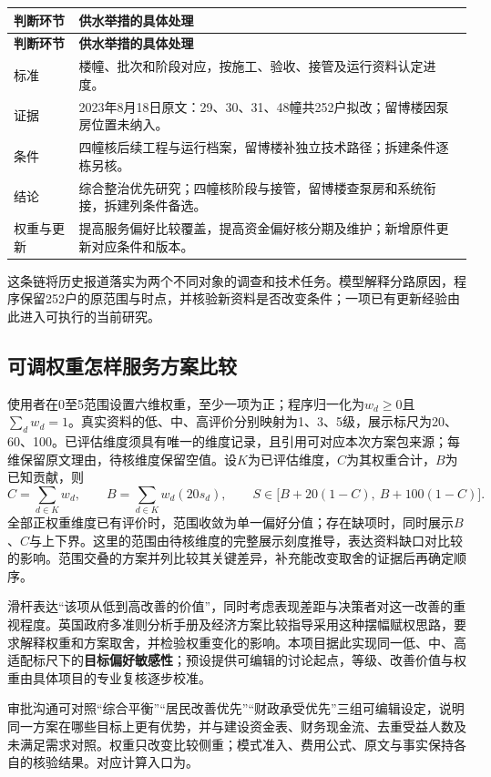 \documentclass[UTF8,11pt,fontset=windows]{ctexart}
\begin{document}
\begin{longtable}{@{}L{27mm}L{132mm}@{}}
\toprule\textbf{判断环节}&\textbf{供水举措的具体处理}\\\midrule
\endfirsthead
\toprule\textbf{判断环节}&\textbf{供水举措的具体处理}\\\midrule
\endhead
标准&楼幢、批次和阶段对应，按施工、验收、接管及运行资料认定进度。\\
证据&2023年8月18日原文：29、30、31、48幢共252户拟改；留博楼因泵房位置未纳入。\cite{water}\\
条件&四幢核后续工程与运行档案，留博楼补独立技术路径；拆建条件逐栋另核。\\
结论&综合整治优先研究；四幢核阶段与接管，留博楼查泵房和系统衔接，拆建列条件备选。\\
权重与更新&提高服务偏好比较覆盖，提高资金偏好核分期及维护；新增原件更新对应条件和版本。\\
\bottomrule\end{longtable}

这条链将历史报道落实为两个不同对象的调查和技术任务。模型解释分路原因，程序保留252户的原范围与时点，并核验新资料是否改变条件；一项已有更新经验由此进入可执行的当前研究。

\subsection{可调权重怎样服务方案比较}

使用者在0至5范围设置六维权重，至少一项为正；程序归一化为$w_d\geq0$且$\sum_dw_d=1$。真实资料的低、中、高评价分别映射为1、3、5级，展示标尺为20、60、100。已评估维度须具有唯一的维度记录，且引用可对应本次方案包来源；每维保留原文理由，待核维度保留空值。设$K$为已评估维度，$C$为其权重合计，$B$为已知贡献，则
\[
C=\sum_{d\in K}w_d,\qquad B=\sum_{d\in K}w_d(20s_d),\qquad
S\in\bigl[B+20(1-C),\ B+100(1-C)\bigr].
\]
全部正权重维度已有评价时，范围收敛为单一偏好分值；存在缺项时，同时展示$B$、$C$与上下界。这里的范围由待核维度的完整展示刻度推导，表达资料缺口对比较的影响。范围交叠的方案并列比较其关键差异，补充能改变取舍的证据后再确定顺序。

滑杆表达“该项从低到高改善的价值”，同时考虑表现差距与决策者对这一改善的重视程度。英国政府多准则分析手册及经济方案比较指导采用这种摆幅赋权思路，要求解释权重和方案取舍，并检验权重变化的影响。\cite{mca2009,mcda2024}本项目据此实现同一低、中、高适配标尺下的\textbf{目标偏好敏感性}；预设提供可编辑的讨论起点，等级、改善价值与权重由具体项目的专业复核逐步校准。

审批沟通可对照“综合平衡”“居民改善优先”“财政承受优先”三组可编辑设定，说明同一方案在哪些目标上更有优势，并与建设资金表、财务现金流、去重受益人数及未满足需求对照。权重只改变比较侧重；模式准入、费用公式、原文与事实保持各自的核验结果。对应计算入口为。
\end{document}
